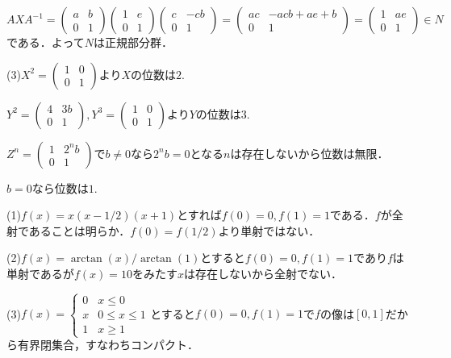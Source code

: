 \documentclass[
		book,
		head_space=20mm,
		foot_space=20mm,
		gutter=10mm,
		line_length=190mm
]{jlreq}
\begin{document}
    $AXA^{-1}=\begin{pmatrix}
        a & b \\
        0 & 1
        \end{pmatrix}\begin{pmatrix}
        1 & e \\
        0 & 1
        \end{pmatrix}\begin{pmatrix}
        c & -cb \\
        0 & 1
        \end{pmatrix}=\begin{pmatrix}
            ac & -acb+ae+b \\
            0 & 1
            \end{pmatrix}=\begin{pmatrix}
                1 & ae \\
                0 & 1
            \end{pmatrix} \in N$である．よって$N$は正規部分群．

(3)$X^2=\begin{pmatrix}
    1 & 0 \\
    0 & 1
\end{pmatrix}$より$X$の位数は$2$.

$Y^2=\begin{pmatrix}
    4 & 3b \\
    0 & 1
    \end{pmatrix},Y^3=\begin{pmatrix}
        1 & 0 \\
        0 & 1
        \end{pmatrix}$より$Y$の位数は$3$.

$Z^n=\begin{pmatrix}
    1 & 2^n b \\
    0 & 1
    \end{pmatrix}$で$b\neq 0$なら$2^nb=0$となる$n$は存在しないから位数は無限．

    $b=0$なら位数は$1$.

(1)$f(x)=x(x-1/2)(x+1)$とすれば$f(0)=0,f(1)=1$である．$f$が全射であることは明らか．$f(0)=f(1/2)$より単射ではない．

(2)$f(x) =\arctan (x)/\arctan(1)$とすると$f(0)=0,f(1)=1$であり$f$は単射であるが$f(x)=10$をみたす$x$は存在しないから全射でない．

(3)$f(x)=\begin{cases}
    0 & x\le 0 \\
    x & 0\le x \le 1 \\
    1 & x\ge 1
\end{cases}$とすると$f(0)=0,f(1)=1$で$f$の像は$[0,1]$だから有界閉集合，すなわちコンパクト．
\end{document}
